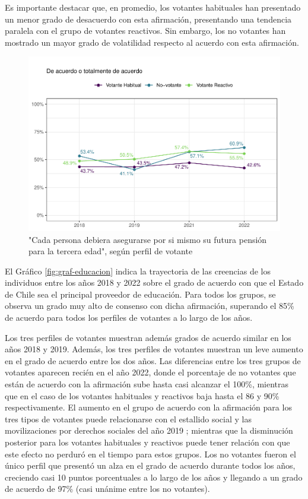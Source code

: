 \documentclass[
  12pt,
]{book}
\begin{document}
Es importante destacar que, en promedio, los votantes habituales han presentado un menor grado de desacuerdo con esta afirmación, presentando una tendencia paralela con el grupo de votantes reactivos. Sin embargo, los no votantes han mostrado un mayor grado de volatilidad respecto al acuerdo con esta afirmación.

\begin{figure}

{\centering \includegraphics{reporte-elsoc_files/figure-latex/graf-pension-1} 

}

\caption{"Cada persona debiera asegurarse por si mismo su futura pensión para la tercera edad", según perfil de votante}\label{fig:graf-pension}
\end{figure}

El Gráfico \ref{fig:graf-educacion} indica la trayectoria de las creencias de los individuos entre los años 2018 y 2022 sobre el grado de acuerdo con que el Estado de Chile sea el principal proveedor de educación. Para todos los grupos, se observa un grado muy alto de consenso con dicha afirmación, superando el 85\% de acuerdo para todos los perfiles de votantes a lo largo de los años.

Los tres perfiles de votantes muestran además grados de acuerdo similar en los años 2018 y 2019. Además, los tres perfiles de votantes muestran un leve aumento en el grado de acuerdo entre los dos años. Las diferencias entre los tres grupos de votantes aparecen recién en el año 2022, donde el porcentaje de no votantes que están de acuerdo con la afirmación sube hasta casi alcanzar el 100\%, mientras que en el caso de los votantes habituales y reactivos baja hasta el 86 y 90\% respectivamente. El aumento en el grupo de acuerdo con la afirmación para los tres tipos de votantes puede relacionarse con el estallido social y las movilizaciones por derechos sociales del año 2019 ; mientras que la disminución posterior para los votantes habituales y reactivos puede tener relación con que este efecto no perduró en el tiempo para estos grupos. Los no votantes fueron el único perfil que presentó un alza en el grado de acuerdo durante todos los años, creciendo casi 10 puntos porcentuales a lo largo de los años y llegando a un grado de acuerdo de 97\% (casi unánime entre los no votantes).
\end{document}
